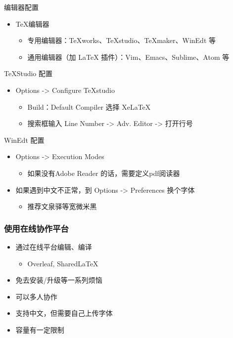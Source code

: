 \begin{frame}{编辑器配置}
  \begin{itemize}
    \item \TeX{}编辑器
      \begin{itemize}
        \item 专用编辑器：TeXworks、\alert{TeXstudio}、TeXmaker、WinEdt 等
        \item 通用编辑器（加 LaTeX 插件）：Vim、Emacs、Sublime、Atom 等
      \end{itemize}
  \end{itemize}
  \begin{exampleblock}{TeXStudio 配置}
    \begin{itemize}
      \item Options -> Configure TeXstudio
        \begin{itemize}
          \item Build：Default Compiler 选择 XeLaTeX
          \item 搜索框输入 Line Number -> Adv. Editor -> 打开行号
        \end{itemize}
    \end{itemize}
  \end{exampleblock}
  \begin{exampleblock}{WinEdt 配置}
    \begin{itemize}
      \item Options -> Execution Modes
        \begin{itemize}
          \item 如果没有Adobe Reader 的话，需要定义pdf阅读器
        \end{itemize}
      \item 如果遇到中文不正常，到 Options -> Preferences 换个字体
        \begin{itemize}
          \item 推荐文泉驿等宽微米黑
        \end{itemize}
          
    \end{itemize}
  \end{exampleblock}
\end{frame}

\begin{frame}[fragile]
  \frametitle{使用在线协作平台}
  \begin{itemize}
    \item 通过在线平台编辑、编译
      \begin{itemize}
        \item Overleaf, SharedLaTeX
      \end{itemize}
    \item 免去安装/升级等一系列烦恼
    \item 可以多人协作
    \item 支持中文，但需要自己上传字体
    \item 容量有一定限制
  \end{itemize}
\end{frame}


